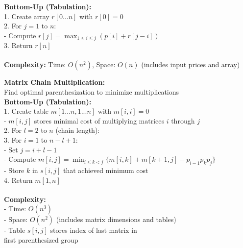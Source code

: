 {{\begin{minipage}[t]{\textwidth}
\begin{minipage}[t]{0.32\textwidth}
\textbf{Bottom-Up (Tabulation):}\\
1. Create array $r[0...n]$ with $r[0] = 0$\\
2. For $j = 1$ to $n$:\\
- Compute $r[j] = \max_{1\leq i\leq j}(p[i] + r[j-i])$\\
3. Return $r[n]$\\[2pt]
\\
\textbf{Complexity:} Time: $O(n^2)$, Space: $O(n)$ (includes input prices and array)
\end{minipage}
\hfill
\begin{minipage}[t]{0.32\textwidth}
\scriptsize
\textbf{Matrix Chain Multiplication:}\\
Find optimal parenthesization to minimize multiplications\\
\textbf{Bottom-Up (Tabulation):}\\
1. Create table $m[1...n, 1...n]$ with $m[i,i] = 0$\\
   - $m[i,j]$ stores minimal cost of multiplying matrices $i$ through $j$\\
2. For $l = 2$ to $n$ (chain length):\\
3. For $i = 1$ to $n-l+1$:\\
- Set $j = i+l-1$\\
- Compute $m[i,j] = \min_{i\leq k<j} \{m[i,k] + m[k+1,j] + p_{i-1}p_kp_j\}$\\
- Store $k$ in $s[i,j]$ that achieved minimum cost\\
4. Return $m[1,n]$\\[2pt]
\\
\textbf{Complexity:}\\
- Time: $O(n^3)$\\
- Space: $O(n^2)$ (includes matrix dimensions and tables)\\
- Table $s[i,j]$ stores index of last matrix in \\first parenthesized group
\end{minipage}
\end{minipage}
}} 